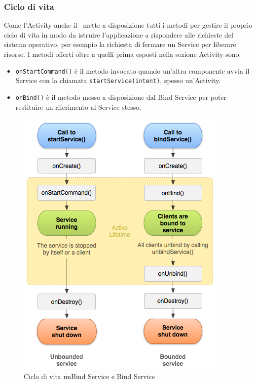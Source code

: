 \documentclass[../ManualeSviluppatore.tex]{subfiles}
\begin{document}
\begin{appendices}
			\subsubsection{Ciclo di vita}
				Come l'Activity anche il \Service\ mette a disposizione tutti i metodi per gestire il proprio ciclo di vita in modo da istruire l'applicazione a rispondere alle richieste del sistema operativo, per esempio la richiesta di fermare un Service per liberare risorse.
				I metodi offerti oltre a quelli prima esposti nella sezione Activity sono:
				\begin{itemize}
					\item \lstinline|onStartCommand()| è il metodo invocato quando un'altra componente avvia il Service con la chiamata \lstinline|startService(intent)|, spesso un'Activity.
					\item \lstinline|onBind()| è il metodo messo a disposizione dal Bind Service per poter restituire un riferimento al Service stesso.
				\end{itemize}
				
				\begin{figure} [p]
					\centering
					\includegraphics[width=\textwidth]{img/ServiceCiclo}
					\caption{Ciclo di vita unBind Service e Bind Service}
					\label{fig:ServiceCiclo}
				\end{figure}
				
\end{appendices}
\end{document}
